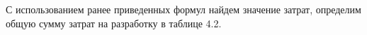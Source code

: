 










С использованием ранее приведенных формул найдем значение затрат, определим общую сумму затрат на разработку в таблице 4.2.

%

